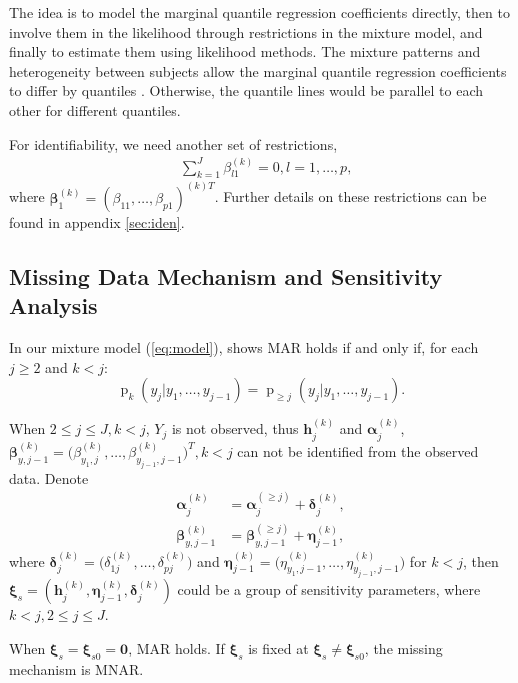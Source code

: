 \documentclass[12pt]{article}
\DeclareMathOperator{\pr}{p}
\begin{document}
The idea is to model the marginal quantile regression coefficients
directly, then to involve them in the likelihood through restrictions
in the mixture model, and finally to estimate them using likelihood
methods. The mixture patterns and heterogeneity between subjects allow
the marginal quantile regression coefficients to differ by quantiles
. Otherwise, the quantile lines would be parallel to each other for
different quantiles.

For identifiability, we need another set of restrictions,
\begin{align*}
  & \sum_{k=1}^J \beta_{l1}^{(k)} = 0, l = 1,\ldots, p,
\end{align*}
where $\bm \beta_1^{(k)} = (\beta_{11}, \ldots,
\beta_{p1})^{(k)T}$. Further details on these restrictions can be
found in appendix \ref{sec:iden}.

\subsection{Missing Data Mechanism and Sensitivity Analysis}
\label{sec:sa}

In our mixture model (\ref{eq:model}), \citep{molen1998} shows MAR
holds if and only if, for each $j \geq 2$ and $k < j$:
\begin{equation}
  \label{eq:molen}
  \pr_k(y_j|y_1, \ldots, y_{j-1}) = \pr_{\geq j}(y_j|y_1, \ldots, y_{j-1}).
\end{equation}

When $2 \leq j \leq J, k < j$, $Y_j$ is not observed, thus $\bm
h_j^{(k)}$ and $\bm \alpha_j^{(k)}$, $ \bm \beta_{y, j-1}^{(k)} =
\big(\beta_{y_1,j}^{(k)}, \ldots, \beta_{y_{j-1},j-1}^{(k)} \big)^T, k
< j$ can not be identified from the observed data. Denote
\begin{align*}
  \bm \alpha_j^{(k)} &= \bm \alpha_j^{(\geq j)} + \bm \delta_{j}^{(k)}, \\
  \bm \beta_{y, j-1}^{(k)} &= \bm \beta_{y, j-1}^{(\geq j)} + \bm
  \eta_{j-1}^{(k)},
\end{align*}
where $\bm \delta_j^{(k)} = \big( \delta_{1j}^{(k)}, \ldots,
\delta_{pj}^{(k)} \big)$ and $\bm \eta_{j-1}^{(k)} = \big(
\eta_{y_1,j-1}^{(k)}, \ldots, \eta_{y_{j-1}, j-1}^{(k)} \big)$ for $k
< j$, then $\bm \xi_s = ( \bm h_j^{(k)} , \bm \eta_{j-1}^{(k)}, \bm
\delta_j^{(k)})$ could be a group of sensitivity parameters, where $k
< j, 2 \leq j \leq J $.

When $\bm \xi_s = \bm \xi_{s0} = \bm 0$, MAR holds. If $\bm \xi_s$ is
fixed at $\bm \xi_s \neq \bm \xi_{s0}$, the missing mechanism is MNAR.
\end{document}
